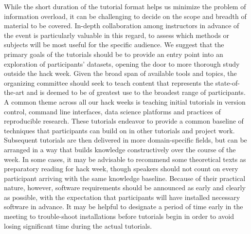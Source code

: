 \documentclass{aastex62}
\begin{document}
While the short duration of the tutorial format helps us minimize the problem of information overload, it can be challenging to decide on the scope and breadth of material to be covered. In-depth collaboration among instructors in advance of the event is particularly valuable in this regard, to assess which methods or subjects will be most useful for the specific audience. We suggest that the primary goals of the tutorials should be to provide an entry point into an exploration of participants' datasets, opening the door to more thorough study outside the hack week. Given the broad span of available tools and topics, the organizing committee should seek to teach content that represents the state-of-the-art and is deemed to be of greatest use to the broadest range of participants. A common theme across all our hack weeks is teaching initial tutorials in version control, command line interfaces, data science platforms and practices of reproducible research. These tutorials endeavor to provide a common baseline of techniques that participants can build on in other tutorials and project work. Subsequent tutorials are then delivered in more domain-specific fields, but can be arranged in a way that builds knowledge constructively over the course of the week. In some cases, it may be advisable to recommend some theoretical texts as preparatory reading for hack week, though speakers should not count on every participant arriving with the same knowledge baseline. Because of their practical nature, however, software requirements should be announced as early and clearly as possible, with the expectation that participants will have installed necessary software in advance. It may be helpful to designate a period of time early in the meeting to trouble-shoot installations before tutorials begin in order to avoid losing significant time during the actual tutorials.
\end{document}
